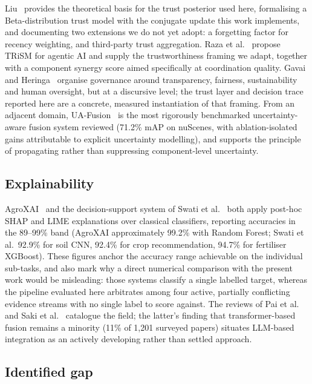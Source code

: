 \documentclass[preprint,12pt]{elsarticle}
\begin{document}
Liu~\cite{liu2020beta} provides the theoretical basis for the trust
posterior used here, formalising a Beta-distribution trust model with the
conjugate update this work implements, and documenting two extensions we do
not yet adopt: a forgetting factor for recency weighting, and third-party
trust aggregation. Raza et al.~\cite{raza2025trism} propose TRiSM for
agentic AI and supply the trustworthiness framing we adapt, together with a
component synergy score aimed specifically at coordination quality. Gavai
and Heringa~\cite{gavai2025agentic} organise governance around
transparency, fairness, sustainability and human oversight, but at a
discursive level; the trust layer and decision trace reported here are a
concrete, measured instantiation of that framing. From an adjacent domain,
UA-Fusion~\cite{shao2025uafusion} is the most rigorously benchmarked
uncertainty-aware fusion system reviewed (71.2\% mAP on nuScenes, with
ablation-isolated gains attributable to explicit uncertainty modelling),
and supports the principle of propagating rather than suppressing
component-level uncertainty.

\subsection{Explainability}

AgroXAI~\cite{turgut2024agroxai} and the decision-support system of Swati
et al.~\cite{swati2026dss} both apply post-hoc SHAP and LIME explanations
over classical classifiers, reporting accuracies in the 89--99\% band
(AgroXAI approximately 99.2\% with Random Forest; Swati et al.\ 92.9\% for
soil CNN, 92.4\% for crop recommendation, 94.7\% for fertiliser XGBoost).
These figures anchor the accuracy range achievable on the individual
sub-tasks, and also mark why a direct numerical comparison with the present
work would be misleading: those systems classify a single labelled target,
whereas the pipeline evaluated here arbitrates among four active,
partially conflicting evidence streams with no single label to score against. The
reviews of Pai et al.~\cite{pai2025review} and Saki et
al.~\cite{saki2024fusion} catalogue the field; the latter's finding that
transformer-based fusion remains a minority (11\% of 1{,}201 surveyed
papers) situates LLM-based integration as an actively developing rather
than settled approach.

\subsection{Identified gap}
\end{document}

